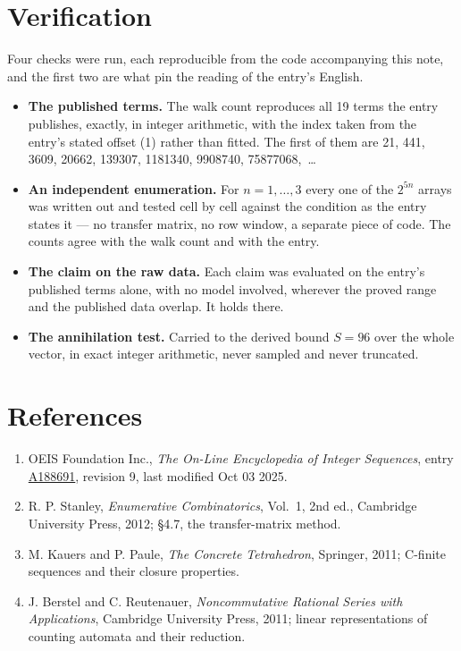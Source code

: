 \documentclass[11pt]{article}
\theoremstyle{definition}
\begin{document}
\section{Verification}

Four checks were run, each reproducible from the code accompanying this note, and the first two are what pin the reading of the entry's English.

\begin{itemize}

\item {\bfseries The published terms.} The walk count reproduces all 19 terms the entry publishes, exactly, in integer arithmetic, with the index taken from the entry's stated offset (1) rather than fitted. The first of them are 21, 441, 3609, 20662, 139307, 1181340, 9908740, 75877068,~\dots

\item {\bfseries An independent enumeration.} For $n = 1,\dots,3$ every one of the $2^{5n}$ arrays was written out and tested cell by cell against the condition as the entry states it --- no transfer matrix, no row window, a separate piece of code. The counts agree with the walk count and with the entry.

\item {\bfseries The claim on the raw data.} Each claim was evaluated on the entry's published terms alone, with no model involved, wherever the proved range and the published data overlap. It holds there.

\item {\bfseries The annihilation test.} Carried to the derived bound $S = 96$ over the whole vector, in exact integer arithmetic, never sampled and never truncated.

\end{itemize}

\section{References}

\begin{enumerate}

\item OEIS Foundation Inc., \emph{The On-Line Encyclopedia of Integer Sequences}, entry \href{https://oeis.org/A188691}{A188691}, revision 9, last modified Oct 03 2025.

\item R. P. Stanley, \emph{Enumerative Combinatorics}, Vol.~1, 2nd ed., Cambridge University Press, 2012; \S4.7, the transfer-matrix method.

\item M. Kauers and P. Paule, \emph{The Concrete Tetrahedron}, Springer, 2011; C-finite sequences and their closure properties.

\item J. Berstel and C. Reutenauer, \emph{Noncommutative Rational Series with Applications}, Cambridge University Press, 2011; linear representations of counting automata and their reduction.

\end{enumerate}
\end{document}
